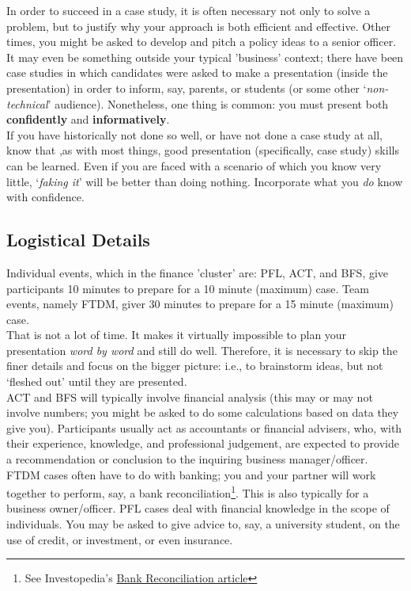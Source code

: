 \documentclass[12pt]{article}
\begin{document}
	In order to succeed in a case study, it is often necessary not only to solve a problem, but to justify why your approach is both efficient and effective. Other times, you might be asked to develop and pitch a policy ideas to a senior officer. It may even be something outside your typical 'business' context; there have been case studies in which candidates were asked to make a presentation (inside the presentation) in order to inform, say, parents, or students (or some other \lq\textit{non-technical}' audience). Nonetheless, one thing is common: you must present both \textbf{confidently} and \textbf{informatively}. \\
	
	If you have historically not done so well, or have not done a case study at all, know that ,as with most things, good presentation (specifically, case study) skills can be learned. Even if you are faced with a scenario of which you know very little, \lq \textit{faking it}' will be better than doing nothing. Incorporate what you \textit{do} know with confidence.

\subsection{Logistical Details}

	Individual events, which in the finance 'cluster' are: PFL, ACT, and BFS, give participants 10 minutes to prepare for a 10 minute (maximum) case. Team events, namely FTDM, giver 30 minutes to prepare for a 15 minute (maximum) case. \\
	
	That is not a lot of time. It makes it virtually impossible to plan your presentation \textit{word by word} and still do well. Therefore, it is necessary to skip the finer details and focus on the bigger picture: i.e., to brainstorm ideas, but not \lq fleshed out' until they are presented. \\

	ACT and BFS will typically involve financial analysis (this may or may not involve numbers; you might be asked to do some calculations based on data they give you). Participants usually act as accountants or financial advisers, who, with their experience, knowledge, and professional judgement, are expected to provide a recommendation or conclusion to the inquiring business manager/officer. FTDM cases often have to do with banking; you and your partner will work together to perform, say, a bank reconciliation\footnote{See Investopedia's \href{http://www.investopedia.com/terms/b/bankreconciliation.asp}{Bank Reconciliation article}}. This is also typically for a business owner/officer. PFL cases deal with financial knowledge in the scope of individuals. You may be asked to give advice to, say, a university student, on the use of credit, or investment, or even insurance. \\
\end{document}
